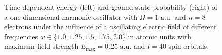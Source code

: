 \begin{figure}[!h]
    \centering
    \caption{Time-dependent energy (left) and ground state probability (right)
        of a one-dimensional harmonic oscillator with $\Omega=1 \text{ a.u.}$
        and $n=8$ electrons under the influence of a oscillating electric field 
        of different frequencies $\omega\in\{1.0, 1.25, 1.5, 1.75, 2.0\}$ in atomic units with 
        maximum field strength $E_\text{max}=0.25  \text{ a.u.}$ and $l=40$ 
        spin-orbitals.
    }
    \label{fig:1d_n10_qd_resonance}
\end{figure}

